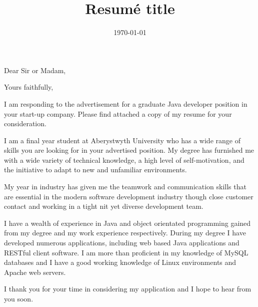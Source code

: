 \documentclass[11pt,a4paper,sans]{moderncv}        %
\title{Resumé title}                               %
\begin{document}
\date{\today}
\opening{Dear Sir or Madam,}
\closing{Yours faithfully,}
\makelettertitle

I am responding to the advertisement for a graduate Java developer position in your start-up company. Please find attached a copy of my resume for your consideration.

I am a final year student at Aberystwyth University who has a wide range of skills you are looking for in your advertised position. My degree has furnished me with a wide variety of technical knowledge, a high level of self-motivation, and the initiative to adapt to new and unfamiliar environments. 

My year in industry has given me the teamwork and communication skills that are essential in the modern software development industry though close customer contact and working in a tight nit yet diverse development team.

I have a wealth of experience in Java and object orientated programming gained from my degree and my work experience respectively. During my degree I have developed numerous applications, including web based Java applications and RESTful client software. I am more than proficient in my knowledge of MySQL databases and I have a good working knowledge of Linux environments and Apache web servers.

I thank you for your time in considering my application and I hope to hear from you soon.

\makeletterclosing
\end{document}
